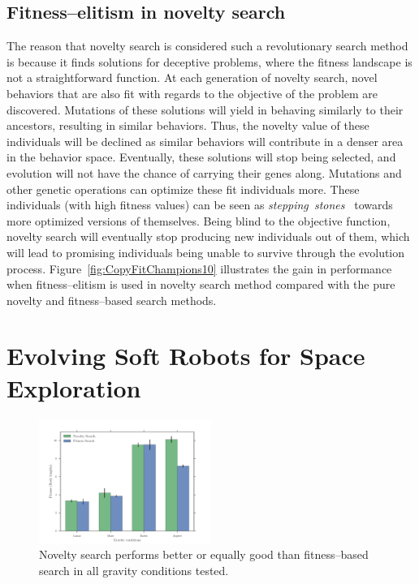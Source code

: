\documentclass{sig-alternate}
\begin{document}
\subsection{Fitness--elitism in novelty search}
The reason that novelty search is considered such a revolutionary search method is because it finds solutions for deceptive problems, where the fitness landscape is not a straightforward function. At each generation of novelty search, novel behaviors that are also fit with regards to the objective of the problem are discovered. Mutations of these solutions will yield in behaving similarly to their ancestors, resulting in similar behaviors. Thus, the novelty value of these individuals will be declined as similar behaviors will contribute in a denser area in the behavior space. Eventually, these solutions will stop being selected, and evolution will not have the chance of carrying their genes along. Mutations and other genetic operations can optimize these fit individuals more. These individuals (with high fitness values) can be seen as \emph{stepping~stones}~\cite{lehman2011abandoning} towards more optimized versions of themselves. Being blind to the objective function, novelty search will eventually stop producing new individuals out of them, which will lead to promising individuals being unable to survive through the evolution process. Figure~\ref{fig:CopyFitChampions10} illustrates the gain in performance when fitness--elitism is used in novelty search method compared with the pure novelty and fitness--based search methods.


\section{Evolving Soft Robots for Space Exploration} 

\begin{figure}[t!]
\centering
\includegraphics[width=0.5\textwidth]{../Figures/Results/GravityExperiment.pdf}
\caption{Novelty search performs better or equally good than fitness--based search in all gravity conditions tested.}
\label{fig:gravityConditions}
\end{figure}
\end{document}
